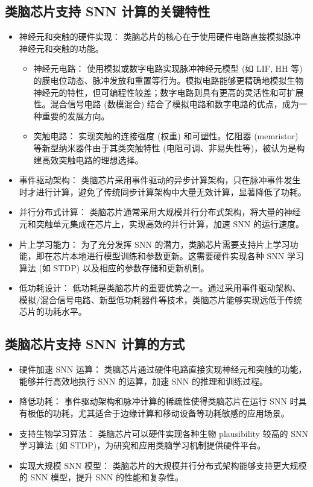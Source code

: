 \documentclass[12pt, a4paper, oneside]{ctexart}
\numberwithin{equation}{section}  %
\begin{document}
\subsection{类脑芯片支持 SNN 计算的关键特性}
\begin{itemize}
    \item 神经元和突触的硬件实现： 类脑芯片的核心在于使用硬件电路直接模拟脉冲神经元和突触的功能。
    \begin{itemize}
        \item 神经元电路： 使用模拟或数字电路实现脉冲神经元模型 (如 LIF, HH 等) 的膜电位动态、脉冲发放和重置等行为。模拟电路能够更精确地模拟生物神经元的特性，但可编程性较差；数字电路则具有更高的灵活性和可扩展性。混合信号电路 (数模混合) 结合了模拟电路和数字电路的优点，成为一种重要的发展方向。
        \item 突触电路： 实现突触的连接强度 (权重) 和可塑性。忆阻器 (memristor) 等新型纳米器件由于其类突触特性 (电阻可调、非易失性等)，被认为是构建高效突触电路的理想选择。
    \end{itemize}
    \item 事件驱动架构：  类脑芯片采用事件驱动的异步计算架构，只在脉冲事件发生时才进行计算，避免了传统同步计算架构中大量无效计算，显著降低了功耗。
    \item 并行分布式计算：  类脑芯片通常采用大规模并行分布式架构，将大量的神经元和突触单元集成在芯片上，实现高效的并行计算，加速 SNN 的运行速度。
    \item 片上学习能力：  为了充分发挥 SNN 的潜力，类脑芯片需要支持片上学习功能，即在芯片本地进行模型训练和参数更新。这需要硬件实现各种 SNN 学习算法 (如 STDP) 以及相应的参数存储和更新机制。
    \item 低功耗设计：  低功耗是类脑芯片的重要优势之一。通过采用事件驱动架构、模拟/混合信号电路、新型低功耗器件等技术，类脑芯片能够实现远低于传统芯片的功耗水平。
\end{itemize}
\subsection{类脑芯片支持 SNN 计算的方式}
\begin{itemize}
    \item 硬件加速 SNN 运算： 类脑芯片通过硬件电路直接实现神经元和突触的功能，能够并行高效地执行 SNN 的运算，加速 SNN 的推理和训练过程。
    \item 降低功耗： 事件驱动架构和脉冲计算的稀疏性使得类脑芯片在运行 SNN 时具有极低的功耗，尤其适合于边缘计算和移动设备等功耗敏感的应用场景。
    \item 支持生物学习算法： 类脑芯片可以硬件实现各种生物 plausibility 较高的 SNN 学习算法 (如 STDP)，为研究和应用类脑学习机制提供硬件平台。
    \item 实现大规模 SNN 模型： 类脑芯片的大规模并行分布式架构能够支持更大规模的 SNN 模型，提升 SNN 的性能和复杂性。
\end{itemize}
\end{document}
